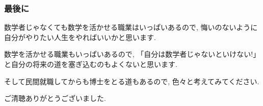 \documentclass[11pt,dvipdfmx]{beamer}
\theoremstyle{definition}
\theoremstyle{remark}
\begin{document}
\begin{frame}


\end{frame}



 
  \begin{frame} 
  \frametitle{最後に}
 \begin{block}{}
\begin{center}
数学者じゃなくても数学を活かせる職業はいっぱいあるので, 悔いのないように自分がやりたい人生をやればいいかと思います.
\end{center}
\end{block}

\vspace{11pt}

数学を活かせる職業もいっぱいあるので, 「自分は数学者じゃないといけない!」と自分の将来の道を塞ぎ込むのもよくないと思います. 

そして民間就職してからも博士をとる道もあるので, 色々と考えてみてください. 

\end{frame}


  \begin{frame} 
  
\begin{center}
ご清聴ありがとうございました. 
\end{center}

\end{frame}
\end{document}
